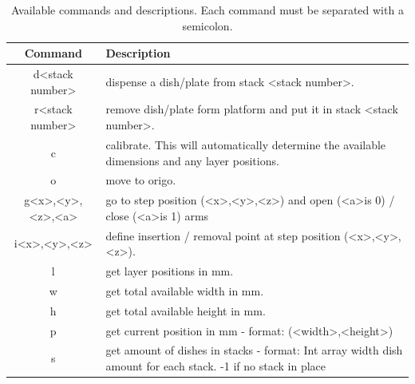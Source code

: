 \documentclass[10pt,a4paper]{article}
\begin{document}
		\begin{table} %
			\begin{center}
				\begin{tabular}{|| c | p{5cm} ||} 
				\hline
				Command & Description\\ [0.5ex] 
				\hline\hline
				d\textless stack number\textgreater & dispense a dish/plate from stack \textless stack number\textgreater . \\ 
				\hline
				r\textless stack number\textgreater & remove dish/plate form platform and put it in stack \textless stack number\textgreater .\\
				\hline
				c & calibrate. This will automatically determine the available dimensions and any layer positions.\\
				\hline
				o & move to origo. \\
				\hline
				g\textless x\textgreater,\textless y\textgreater,\textless z\textgreater,\textless a\textgreater & go to step position (\textless x\textgreater,\textless y\textgreater,\textless z\textgreater) and open (\textless a\textgreater \space is 0) / close (\textless a\textgreater \space is 1) arms \\
				\hline
				i\textless x\textgreater,\textless y\textgreater,\textless z\textgreater & define insertion / removal point at step position (\textless x\textgreater,\textless y\textgreater,\textless z\textgreater).\\
					 \hline
				l & get layer positions in mm. \\
				\hline
				w & get total available width in mm. \\
				\hline
				h & get total available height in mm. \\
				\hline
				p & get current position in mm - format: (\textless width\textgreater ,\textless height\textgreater ) \\
				\hline
				s & get amount of dishes in stacks - format: Int array width dish amount for each stack. -1 if no stack in place\\ %
				\hline
					\end{tabular}
			\end{center}
			\caption{Available commands and descriptions. Each command must be separated with a semicolon.} \label{table:commands}
		\end{table}	
			
\end{document}
